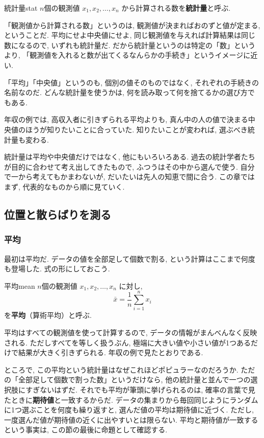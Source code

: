     \begin{defi}{統計量}{stat}
      $n$個の観測値 $x_1, x_2, \ldots, x_n$ から計算される数を\textbf{統計量}と呼ぶ.
    \end{defi}

    「観測値から計算される数」というのは, 観測値が決まればおのずと値が定まる, ということだ.
    平均にせよ中央値にせよ, 同じ観測値を与えれば計算結果は同じ数になるので, いずれも統計量だ.
    だから統計量というのは特定の「数」というより, 「観測値を入れると数が出てくるなんらかの手続き」というイメージに近い.

    「平均」「中央値」というのも, 個別の値そのものではなく, それぞれの手続きの名前なのだ.
    どんな統計量を使うかは, 何を読み取って何を捨てるかの選び方でもある.

    年収の例では, 高収入者に引きずられる平均よりも, 真ん中の人の値で決まる中央値のほうが知りたいことに合っていた.
    知りたいことが変われば, 選ぶべき統計量も変わる.

    統計量は平均や中央値だけではなく, 他にもいろいろある.
    過去の統計学者たちが目的に合わせて考え出してきたもので, ふつうはその中から選んで使う.
    自分で一から考えてもかまわないが, だいたいは先人の知恵で間に合う.
    この章ではまず, 代表的なものから順に見ていく.


  \subsection{位置と散らばりを測る}

    \subsubsection*{平均}

    最初は平均だ.
    データの値を全部足して個数で割る, という計算はここまで何度も登場した.
    式の形にしておこう.

    \begin{defi}{平均}{mean}
      $n$個の観測値 $x_1, x_2, \ldots, x_n$ に対し,
      \[
        \bar{x} = \frac{1}{n} \sum_{i=1}^{n} x_i
      \]
      を\textbf{平均}（算術平均）と呼ぶ.
    \end{defi}

    平均はすべての観測値を使って計算するので, データの情報がまんべんなく反映される.
    ただしすべてを等しく扱うぶん, 極端に大きい値や小さい値が1つあるだけで結果が大きく引きずられる.
    年収の例で見たとおりである.

    ところで, この平均という統計量はなぜこれほどポピュラーなのだろうか.
    ただの「全部足して個数で割った数」というだけなら, 他の統計量と並んで一つの選択肢にすぎないはずだ.
    それでも平均が筆頭に挙げられるのは, 確率の言葉で見たときに\textbf{期待値}と一致するからだ.
    データの集まりから毎回同じようにランダムに1つ選ぶことを何度も繰り返すと, 選んだ値の平均は期待値に近づく.
    ただし, 一度選んだ値が期待値の近くに出やすいとは限らない.
    平均と期待値が一致するという事実は, この節の最後に命題として確認する.

